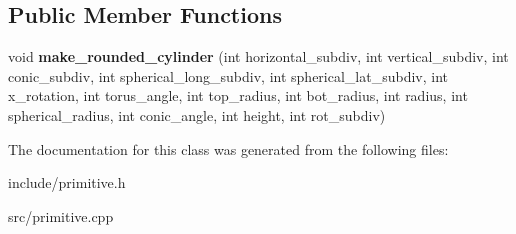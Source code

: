 \subsection*{Public Member Functions}
\begin{DoxyCompactItemize}
\item 
\mbox{\label{classrounded__cylinder_a6c3bab2b6b7d1cc906caf8d570d29b91}} 
void {\bfseries make\+\_\+rounded\+\_\+cylinder} (int horizontal\+\_\+subdiv, int vertical\+\_\+subdiv, int conic\+\_\+subdiv, int spherical\+\_\+long\+\_\+subdiv, int spherical\+\_\+lat\+\_\+subdiv, int x\+\_\+rotation, int torus\+\_\+angle, int top\+\_\+radius, int bot\+\_\+radius, int radius, int spherical\+\_\+radius, int conic\+\_\+angle, int height, int rot\+\_\+subdiv)
\end{DoxyCompactItemize}


The documentation for this class was generated from the following files\+:\begin{DoxyCompactItemize}
\item 
include/primitive.\+h\item 
src/primitive.\+cpp\end{DoxyCompactItemize}
